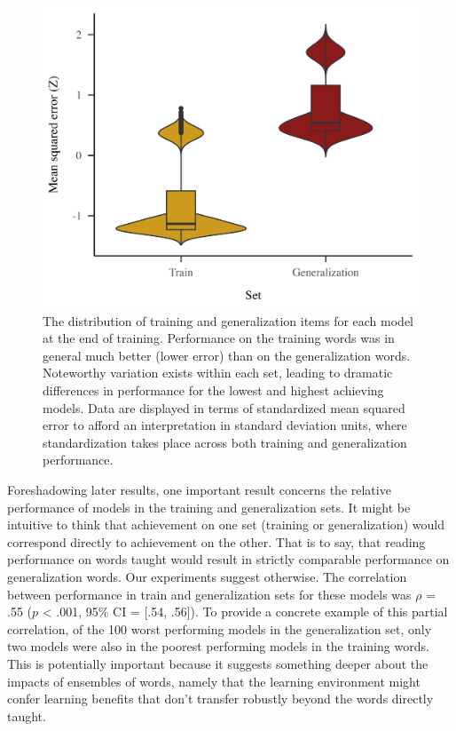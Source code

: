 \documentclass[
  ,man,floatsintext]{apa6}
\begin{document}
\begin{figure}
\includegraphics[width=10in]{img/results_figure2} \caption{The distribution of training and generalization items for each model at the end of training. Performance on the training words was in general much better (lower error) than on the generalization words. Noteworthy variation exists within each set, leading to dramatic differences in performance for the lowest and highest achieving models. Data are displayed in terms of standardized mean squared error to afford an interpretation in standard deviation units, where standardization takes place across both training and generalization performance.}\label{fig:figure2}
\end{figure}

Foreshadowing later results, one important result concerns the relative performance of models in the training and generalization sets. It might be intuitive to think that achievement on one set (training or generalization) would correspond directly to achievement on the other. That is to say, that reading performance on words taught would result in strictly comparable performance on generalization words. Our experiments suggest otherwise. The correlation between performance in train and generalization sets for these models was \(\rho\) = .55 (\(p\) \textless{} .001, 95\% CI = {[}.54, .56{]}). To provide a concrete example of this partial correlation, of the 100 worst performing models in the generalization set, only two models were also in the poorest performing models in the training words. This is potentially important because it suggests something deeper about the impacts of ensembles of words, namely that the learning environment might confer learning benefits that don't transfer robustly beyond the words directly taught.
\end{document}
